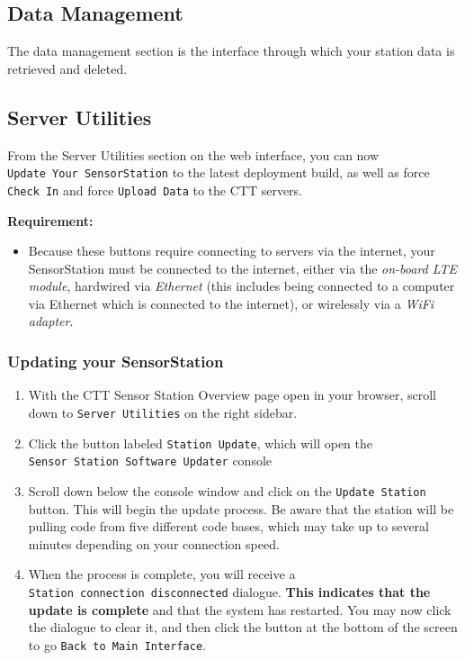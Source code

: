 \documentclass[
]{article}
\providecommand{\tightlist}{%
  \setlength{\itemsep}{0pt}\setlength{\parskip}{0pt}}
\begin{document}
\hypertarget{data-management}{%
\subsection{Data Management}\label{data-management}}

The data management section is the interface through which your station
data is retrieved and deleted.

\hypertarget{server-utilities}{%
\subsection{Server Utilities}\label{server-utilities}}

From the Server Utilities section on the web interface, you can now
\texttt{Update\ Your\ SensorStation} to the latest deployment build, as
well as force \texttt{Check\ In} and force \texttt{Upload\ Data} to the
CTT servers.

\textbf{Requirement:}

\begin{itemize}
\tightlist
\item
  Because these buttons require connecting to servers via the internet,
  your SensorStation must be connected to the internet, either via the
  \emph{on-board LTE module}, hardwired via \emph{Ethernet} (this
  includes being connected to a computer via Ethernet which is connected
  to the internet), or wirelessly via a \emph{WiFi adapter}.
\end{itemize}

\hypertarget{updating-your-sensorstation}{%
\subsubsection{Updating your
SensorStation}\label{updating-your-sensorstation}}

\begin{enumerate}
\def\labelenumi{\arabic{enumi}.}
\tightlist
\item
  With the CTT Sensor Station Overview page open in your browser, scroll
  down to \texttt{Server\ Utilities} on the right sidebar.
\item
  Click the button labeled \texttt{Station\ Update}, which will open the
  \texttt{Sensor\ Station\ Software\ Updater} console
\item
  Scroll down below the console window and click on the
  \texttt{Update\ Station} button. This will begin the update process.
  Be aware that the station will be pulling code from five different
  code bases, which may take up to several minutes depending on your
  connection speed.
\item
  When the process is complete, you will receive a
  \texttt{Station\ connection\ disconnected} dialogue. \textbf{This
  indicates that the update is complete} and that the system has
  restarted. You may now click the dialogue to clear it, and then click
  the button at the bottom of the screen to go
  \texttt{Back\ to\ Main\ Interface}.
\end{enumerate}
\end{document}
